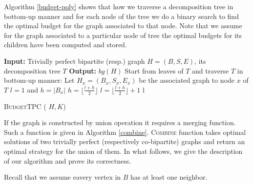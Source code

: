 \documentclass[letterpaper,11pt,abstracton]{scrartcl}
\begin{document}
Algorithm \ref{budget-poly} shows that how we traverse a decomposition tree in bottom-up manner and for each node of the tree we do a binary search to find the optimal budget for the graph associated to that node. Note that we assume for the graph associated to a particular node of tree the optimal budgets for its children have been computed and stored.
\begin{algorithm}[H]
\begin{algorithmic}[1]
\State \textbf{Input:} Trivially perfect bipartite (resp.) graph $H=(B,S,E)$, its decomposition tree $T$\;
\State \textbf{Output:} $bg(H)$\;
\State Start from leaves of $T$ and traverse $T$ in bottom-up manner:\;
\State Let $H_x=(B_x,S_x,E_x)$ be the associated graph to node $x$ of $T$\;
\State{}
\State $l=1$ and $h=|B_x|$
    	\State $h=\lfloor\frac{l+h}{2}\rfloor$ \;
        \Else
        	\State $l=\lfloor\frac{l+h}{2}\rfloor+1$
    \EndIf
\EndWhile
\Return l\;
\end{algorithmic}
\caption{{\textsc{BudgetTPC}} ( $H, K$)}
\label{budget-poly}
\end{algorithm}

If the graph is constructed by union operation it requires a merging function. Such a function is given
in Algorithm \ref{combine}. \textsc{Combine} function takes optimal solutions of two trivially perfect (respectively co-bipartite)
graphs and return an optimal strategy for the union of them. In what follows, we give the  description of our algorithm and prove its correctness.

Recall that we assume eavery vertex in $B$ has at least one neighbor. 
\end{document}
